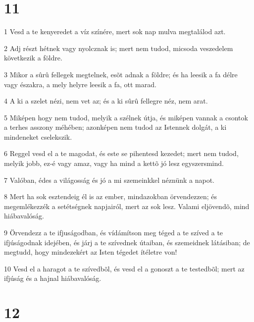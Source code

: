 \chapter{11}

\par 1 Vesd a te kenyeredet a víz színére, mert sok nap mulva megtalálod azt.
\par 2 Adj részt hétnek vagy nyolcznak is; mert nem tudod, micsoda veszedelem következik a földre.
\par 3 Mikor a sûrû fellegek megtelnek, esõt adnak a földre; és ha leesik a fa délre vagy északra, a mely helyre leesik a fa, ott marad.
\par 4 A ki a szelet nézi, nem vet az; és a ki sûrû fellegre néz, nem arat.
\par 5 Miképen hogy nem tudod, melyik a szélnek útja, és miképen vannak a csontok a terhes asszony méhében; azonképen nem tudod az Istennek dolgát, a ki mindeneket cselekszik.
\par 6 Reggel vesd el a te magodat, és este se pihentesd kezedet; mert nem tudod, melyik jobb, ez-é vagy amaz, vagy ha mind a kettõ jó lesz egyszersmind.
\par 7 Valóban, édes a világosság és jó a mi szemeinkkel néznünk a napot.
\par 8 Mert ha sok esztendeig él is az ember, mindazokban örvendezzen; és megemlékezzék a setétségnek napjairól, mert az sok lesz. Valami eljövendõ, mind hiábavalóság.
\par 9 Örvendezz a te ifjuságodban, és vídámítson meg téged a te szíved a te ifjúságodnak idejében, és járj a te szívednek útaiban, és szemeidnek látásiban; de megtudd, hogy mindezekért az Isten tégedet ítéletre von!
\par 10 Vesd el a haragot a te szívedbõl, és vesd el a gonoszt a te testedbõl; mert az ifjúság és a hajnal hiábavalóság.

\chapter{12}

